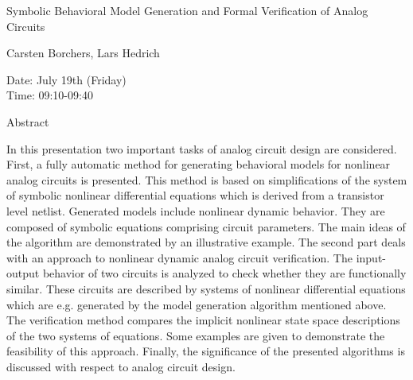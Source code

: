 \begin{center}
\LARGE
Symbolic Behavioral Model Generation and Formal Verification of Analog Circuits
\end{center}

\begin{center}
\Large
Carsten Borchers, Lars Hedrich
\end{center}

\noindent
Date:  July 19th (Friday)\\
Time: 09:10-09:40\\

\begin{center}
\large
Abstract
\end{center}

In this presentation two important tasks of analog circuit design are considered. First, a fully
automatic method for generating behavioral models for nonlinear analog circuits is presented. This
method is based on simplifications of the system of symbolic nonlinear differential equations
which is derived from a transistor level netlist. Generated models include nonlinear dynamic
behavior. They are composed of symbolic equations comprising circuit parameters. The main ideas
of the algorithm are demonstrated by an illustrative example. The second part deals with an
approach to nonlinear dynamic analog circuit verification. The input-output behavior of two
circuits is analyzed to check whether they are functionally similar. These circuits are described by
systems of nonlinear differential equations which are e.g. generated by the model generation
algorithm mentioned above. The verification method compares the implicit nonlinear state space
descriptions of the two systems of equations. Some examples are given to demonstrate the
feasibility of this approach. Finally, the significance of the presented algorithms is discussed with
respect to analog circuit design. 

